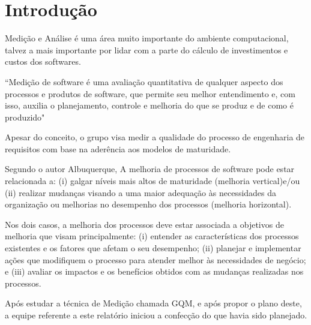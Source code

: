 \chapter{Introdução}

Medição e Análise é uma área muito importante do ambiente computacional, talvez a mais importante por lidar com a parte do cálculo de investimentos e custos dos softwares.

 “Medição de software é uma avaliação quantitativa de qualquer aspecto dos processos e produtos de software, que permite seu melhor entendimento e, com
isso, auxilia o planejamento, controle e melhoria do que se produz e de como é produzido"~\cite{rocha2012mediccao}

Apesar do conceito, o grupo visa medir a qualidade do processo de engenharia de requisitos com base na aderência aos modelos de maturidade.

Segundo o autor Albuquerque, A melhoria de processos de software pode estar relacionada a: (i) galgar
níveis mais altos de maturidade (melhoria vertical)e/ou (ii) realizar mudanças visando a uma maior adequação às necessidades da organização ou melhorias no
desempenho dos processos (melhoria horizontal).\cite{albuquerque2008avaliaccao}

Nos dois casos, a melhoria dos
processos deve estar associada a objetivos de melhoria que visam principalmente:
(i) entender as características dos processos existentes e os fatores que afetam o
seu desempenho; (ii) planejar e implementar ações que modifiquem o processo
para atender melhor às necessidades de negócio; e (iii) avaliar os impactos e os
benefícios obtidos com as mudanças realizadas nos processos.\cite{albuquerque2008avaliaccao}

Após estudar a técnica de Medição chamada GQM, e após propor o plano deste, a equipe referente a este relatório iniciou a confecção do que havia sido planejado.
